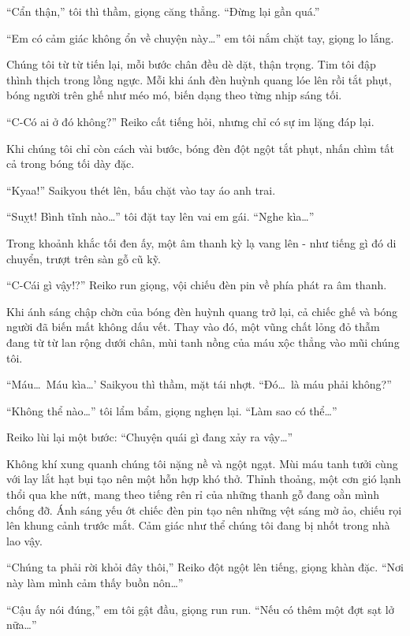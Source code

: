 \documentclass[../main.tex]{subfiles}
\begin{document}
``Cẩn thận,'' tôi thì thầm, giọng căng thẳng. ``Đừng lại gần quá.''

``Em có cảm giác không ổn về chuyện này\dots'' em tôi nắm chặt tay, giọng lo lắng.

Chúng tôi từ từ tiến lại, mỗi bước chân đều dè dặt, thận trọng. Tim tôi đập thình thịch trong lồng ngực. Mỗi khi ánh đèn huỳnh quang lóe lên rồi tắt phụt, bóng người trên ghế như méo mó, biến dạng theo từng nhịp sáng tối.

``C-Có ai ở đó không?'' Reiko cất tiếng hỏi, nhưng chỉ có sự im lặng đáp lại.

Khi chúng tôi chỉ còn cách vài bước, bóng đèn đột ngột tắt phụt, nhấn chìm tất cả trong bóng tối dày đặc.

``Kyaa!'' Saikyou thét lên, bấu chặt vào tay áo anh trai.

``Suỵt! Bình tĩnh nào\dots'' tôi đặt tay lên vai em gái. ``Nghe kìa\dots''

Trong khoảnh khắc tối đen ấy, một âm thanh kỳ lạ vang lên - như tiếng gì đó di chuyển, trượt trên sàn gỗ cũ kỹ.

``C-Cái gì vậy!?'' Reiko run giọng, vội chiếu đèn pin về phía phát ra âm thanh.

Khi ánh sáng chập chờn của bóng đèn huỳnh quang trở lại, cả chiếc ghế và bóng người đã biến mất không dấu vết. Thay vào đó, một vũng chất lỏng đỏ thẫm đang từ từ lan rộng dưới chân, mùi tanh nồng của máu xộc thẳng vào mũi chúng tôi.

``Máu\dots\ Máu kìa\dots' Saikyou thì thầm, mặt tái nhợt. ``Đó\dots\ là máu phải không?''

``Không thể nào\dots'' tôi lẩm bẩm, giọng nghẹn lại. ``Làm sao có thể\dots''

Reiko lùi lại một bước: ``Chuyện quái gì đang xảy ra vậy\dots''

Không khí xung quanh chúng tôi nặng nề và ngột ngạt. Mùi máu tanh tưởi cùng với lay lắt hạt bụi tạo nên một hỗn hợp khó thở. Thỉnh thoảng, một cơn gió lạnh thổi qua khe nứt, mang theo tiếng rên rỉ của những thanh gỗ đang oằn mình chống đỡ. Ánh sáng yếu ớt chiếc đèn pin tạo nên những vệt sáng mờ ảo, chiếu rọi lên khung cảnh trước mắt. Cảm giác như thể chúng tôi đang bị nhốt trong nhà lao vậy.

``Chúng ta phải rời khỏi đây thôi,'' Reiko đột ngột lên tiếng, giọng khàn đặc. ``Nơi này làm mình cảm thấy buồn nôn\dots''

``Cậu ấy nói đúng,'' em tôi gật đầu, giọng run run. ``Nếu có thêm một đợt sạt lở nữa\dots''
\end{document}
